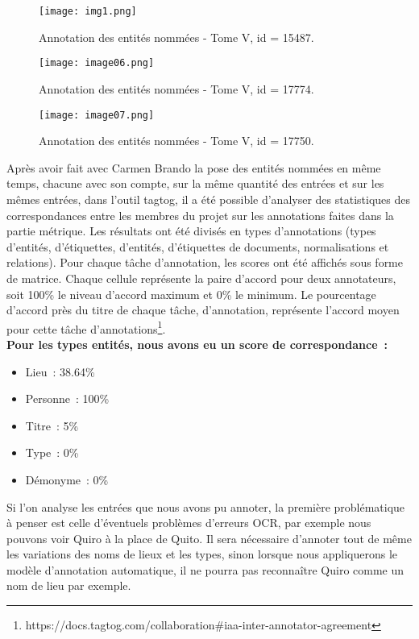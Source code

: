 \documentclass[a4paper,12pt,twoside]{book}
\begin{document}
\begin{figure}[!h]
    \centering
    \texttt{[image: img1.png]}
    \caption{Annotation des entités nommées - Tome V, id = 15487.}
    \label{huitFig}
\end{figure}
	
\begin{figure}[!h]
    \centering
    \texttt{[image: image06.png]}
    \caption{Annotation des entités nommées - Tome V, id = 17774.}
    \label{neufFig}
\end{figure}

\begin{figure}[!h]
    \centering
    \texttt{[image: image07.png]}
    \caption{Annotation des entités nommées - Tome V, id = 17750.}
    \label{dixFig}
\end{figure}

Après avoir fait avec Carmen Brando la pose des entités nommées en même temps, chacune avec son compte, sur la même quantité des entrées et sur les mêmes entrées, dans l’outil tagtog, il a été possible d’analyser des statistiques des correspondances entre les membres du projet sur les annotations faites dans la partie métrique. Les résultats ont été divisés en types d’annotations (types d'entités, d’étiquettes, d'entités, d’étiquettes de documents, normalisations et relations). Pour chaque tâche d'annotation, les scores ont été affichés sous forme de matrice. Chaque cellule représente la paire d'accord pour deux annotateurs, soit 100\% le niveau d'accord maximum et 0\% le minimum. Le pourcentage d'accord près du titre de chaque tâche, d'annotation, représente l'accord moyen pour cette tâche d'annotations\footnote{https://docs.tagtog.com/collaboration\#iaa-inter-annotator-agreement}.\\

\textbf{Pour les types entités, nous avons eu un score de correspondance :}
\\
\begin{itemize}
    \item Lieu :  38.64\%
    \item Personne : 100\%
    \item Titre : 5\%
    \item Type : 0\%
    \item Démonyme : 0\%\\
\end{itemize}
	
Si l’on analyse les entrées que nous avons pu annoter, la première problématique à penser est celle d’éventuels problèmes d'erreurs \Gls{OCR}, par exemple nous pouvons voir Quiro à la place de Quito. Il sera nécessaire d’annoter tout de même les variations des noms de lieux et les types, sinon lorsque nous appliquerons le modèle d’annotation automatique, il ne pourra pas reconnaître Quiro comme un nom de lieu par exemple.
\end{document}
